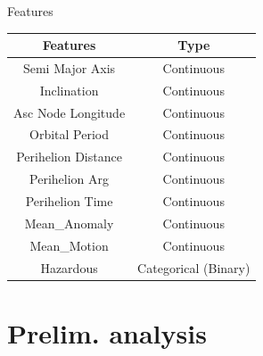 \documentclass{beamer}
\begin{document}
\begin{frame}{Features}
\begin{table}[]
\begin{center}
\begin{tabular}{c|c}
\hline
\textbf{Features}             & \textbf{Type}        \\ \hline
Semi Major Axis               & Continuous           \\ \hline
Inclination                   & Continuous           \\ \hline
Asc Node Longitude            & Continuous           \\ \hline
Orbital Period                & Continuous           \\ \hline
Perihelion Distance           & Continuous           \\ \hline
Perihelion Arg                & Continuous           \\ \hline
Perihelion Time               & Continuous           \\ \hline
Mean\_Anomaly                 & Continuous           \\ \hline
Mean\_Motion                  & Continuous           \\ \hline
Hazardous                     & Categorical (Binary)
\end{tabular}
\end{center}
\label{tab_features}
\end{table}

\end{frame}


\section{Prelim. analysis}
\end{document}
